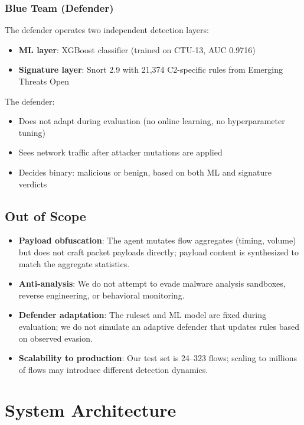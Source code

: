 \documentclass[12pt,a4paper]{report}
\begin{document}
\subsection{Blue Team (Defender)}
The defender operates two independent detection layers:
\begin{itemize}
  \item \textbf{ML layer}: XGBoost classifier (trained on CTU-13, AUC 0.9716)
  \item \textbf{Signature layer}: Snort 2.9 with 21,374 C2-specific rules from Emerging Threats Open
\end{itemize}

The defender:
\begin{itemize}
  \item Does not adapt during evaluation (no online learning, no hyperparameter tuning)
  \item Sees network traffic after attacker mutations are applied
  \item Decides binary: malicious or benign, based on both ML and signature verdicts
\end{itemize}

\section{Out of Scope}

\begin{itemize}
  \item \textbf{Payload obfuscation}: The agent mutates flow aggregates (timing, volume) but does not craft packet payloads directly; payload content is synthesized to match the aggregate statistics.
  
  \item \textbf{Anti-analysis}: We do not attempt to evade malware analysis sandboxes, reverse engineering, or behavioral monitoring.
  
  \item \textbf{Defender adaptation}: The ruleset and ML model are fixed during evaluation; we do not simulate an adaptive defender that updates rules based on observed evasion.
  
  \item \textbf{Scalability to production}: Our test set is 24–323 flows; scaling to millions of flows may introduce different detection dynamics.
\end{itemize}

\chapter{System Architecture}
\end{document}
